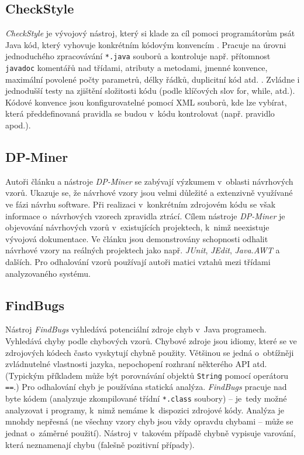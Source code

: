 \subsection{CheckStyle}
\emph{CheckStyle} je vývojový nástroj, který si klade za cíl pomoci programátorům psát Java kód, který vyhovuje konkrétním kódovým konvencím \cite{existingtools:checkstyle}. Pracuje na úrovni jednoduchého zpracovávání \verb+*.java+ souborů a kontroluje např. přítomnost \verb+javadoc+ komentářů nad třídami, atributy a metodami, jmenné konvence, maximální povolené počty parametrů, délky řádků, duplicitní kód atd. \cite{existingtools:checkstyle-wiki}. Zvládne i jednodušší testy na zjištění složitosti kódu (podle klíčových slov for, while, atd.). Kódové konvence jsou konfigurovatelné pomocí XML souborů, kde lze vybírat, která předdefinovaná pravidla se budou v~kódu kontrolovat (např. pravidlo \mbox{} apod.).

\subsection{DP-Miner}
Autoři článku \cite{4273268} a nástroje \emph{DP-Miner} \cite{existingtools:dp-miner} se zabývají výzkumem v~oblasti návrhových vzorů. Ukazuje se, že návrhové vzory jsou velmi důležité a extenzivně využívané ve fázi návrhu software. Při realizaci v~konkrétním zdrojovém kódu se však informace o~návrhových vzorech zpravidla ztrácí. Cílem nástroje \emph{DP-Miner} je objevování návrhových vzorů v~existujících projektech, k~nimž neexistuje vývojová dokumentace. Ve článku \cite{4273268} jsou demonstrovány schopnosti odhalit návrhové vzory na reálných projektech jako např. \emph{JUnit}, \emph{JEdit}, \emph{Java.AWT} a dalších. Pro odhalování vzorů používají autoři matici vztahů mezi třídami analyzovaného systému.

\subsection{FindBugs}
Nástroj \emph{FindBugs} \cite{existingtools:findbugs} vyhledává potenciální zdroje chyb v~Java programech. Vyhledává chyby podle chybových vzorů. Chybové zdroje jsou idiomy, které se ve zdrojových kódech často vyskytují chybně použity. Většinou se jedná o~obtížněji zvládnutelné vlastnosti jazyka, nepochopení rozhraní některého API atd. (Typickým příkladem může být porovnávání objektů \verb+String+ pomocí operátoru \verb+==+.) Pro odhalování chyb je používána statická analýza. \emph{FindBugs} pracuje nad byte kódem (analyzuje zkompilované třídní \verb-*.class- soubory) -- \mbox{je tedy} možné analyzovat i programy, k~nimž nemáme k~dispozici zdrojové kódy. Analýza je mnohdy nepřesná (ne všechny vzory chyb jsou vždy opravdu chybami -- může se jednat o~záměrné použití). Nástroj v~takovém případě chybně vypisuje varování, která neznamenají chybu (falešně pozitivní případy).

